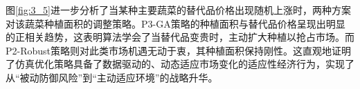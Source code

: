 \documentclass[withoutpreface,bwprint]{cumcmthesis} %
\begin{document}
图\ref{fig:3_5}进一步分析了当某种主要蔬菜的替代品价格出现随机上涨时，两种方案对该蔬菜种植面积的调整策略。P3-GA策略的种植面积与替代品价格呈现出明显的正相关趋势，这表明算法学会了当替代品变贵时，主动扩大种植以抢占市场。而P2-Robust策略则对此类市场机遇无动于衷，其种植面积保持刚性。这直观地证明了仿真优化策略具备了数据驱动的、动态适应市场变化的适应性经济行为，实现了从“被动防御风险”到“主动适应环境”的战略升华。

\newpage



\newpage
\end{document}
